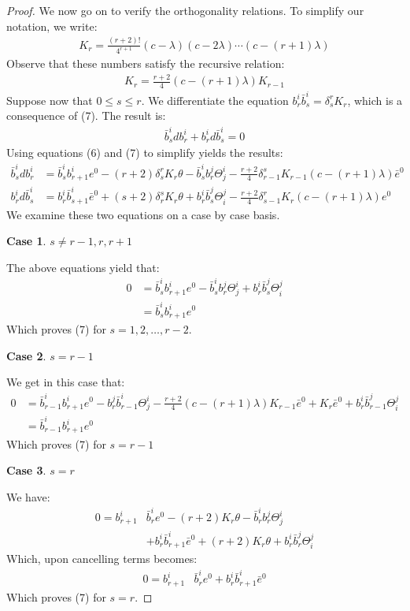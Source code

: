 \documentclass[11pt]{amsart}
\newtheorem{case}{Case}
\theoremstyle{definition}
\theoremstyle{definition}
\begin{document}
\begin{proof}
We now go on to verify the orthogonality relations.  To simplify our notation, we write:
%
\begin{align*}
K_r = \frac{(r + 2)!}{4^{r + 1}} (c - \lambda)(c - 2 \lambda) \cdots (c - (r+1) \lambda)
\end{align*}
%
Observe that these numbers satisfy the recursive relation:
%
\begin{align*}
K_{r} = \frac{r+2}{4} (c - (r+1) \lambda ) K_{r-1}
\end{align*}
%
Suppose now that $0 \leq s \leq r$.  We differentiate the equation $b^i_r \bar{b}^i_s = \delta^r_s K_r$, which is a consequence of (7).  The result is:
%
\begin{align*}
\bar{b}^i_s d b^i_r + b^i_r d \bar{b}^i_s = 0
\end{align*}
%
Using equations (6) and (7) to simplify yields the results:
%
\begin{align*}
\bar{b}^i_s d b^i_r &= \bar{b}^i_s b^i_{r+1} e^0 - (r+2) \delta^r_s K_r \theta - \bar{b}^i_s b^j_r \Theta^i_j - \frac{r+2}{4} \delta^s_{r-1} K_{r-1} (c - (r+1) \lambda ) \bar{e}^0 \\
b^i_r d \bar{b}^i_s &= b^i_r \bar{b}^i_{s+1} \bar{e}^0 + (s + 2) \delta^s_r K_r \theta + b^i_r \bar{b}^j_s \Theta^j_i - \frac{r+2}{4} \delta^r_{s-1} K_r (c-(r+1) \lambda) e^0
\end{align*} 
%
We examine these two equations on a case by case basis.

\begin{case} $s \neq r-1,r,r+1$
\end{case}
%
The above equations yield that:
%
\begin{align*}
0 &= \bar{b}^i_s b^i_{r+1} e^0 - \bar{b}^i_s b^j_r \Theta^i_j + b^i_r \bar{b}^j_s \Theta^j_i \\
&= \bar{b}^i_s b^i_{r+1} e^0
\end{align*}
%
Which proves (7) for $s = 1,2,\ldots, r-2$.

\begin{case} $s = r-1$
\end{case}
%
We get in this case that:
%
\begin{align*}
0 &= \bar{b}^i_{r-1} b^i_{r+1} e^0 - b^j_r \bar{b}^i_{r-1} \Theta^i_j - \frac{r+2}{4} (c - (r+1) \lambda ) K_{r-1} \bar{e}^0 + K_r \bar{e}^0 + b^i_r \bar{b}^j_{r-1} \Theta^j_i \\
&= \bar{b}^i_{r-1} b^i_{r+1} e^0
\end{align*}
%
Which proves (7) for $s = r - 1$

\begin{case} $s = r$
\end{case}
%
We have:
%
\begin{align*}
0 = b^i_{r+1} & \bar{b}^i_r e^0 - (r+2) K_r \theta - \bar{b}^i_r b^j_r \Theta^i_j \\
&+ b^i_r \bar{b}^i_{r+1} \bar{e}^0 + (r+2) K_r \theta + b^i_r \bar{b}^j_r \Theta^j_i 
\end{align*}
%
Which, upon cancelling terms becomes:
%
\begin{align*}
0 = b^i_{r+1} & \bar{b}^i_r e^0 +  b^i_r \bar{b}^i_{r+1} \bar{e}^0
\end{align*}
%
Which proves (7) for $s = r$.


\end{proof}
\end{document}
